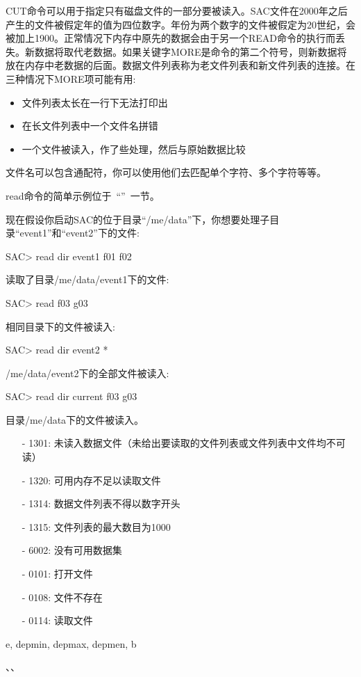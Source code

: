 CUT命令可以用于指定只有磁盘文件的一部分要被读入。SAC文件在2000年之后产生的文件被假定年的值为四位数字。年份为两个数字的文件被假定为20世纪，会被加上1900。正常情况下内存中原先的数据会由于另一个READ命令的执行而丢失。新数据将取代老数据。如果关键字MORE是命令的第二个符号，则新数据将放在内存中老数据的后面。数据文件列表称为老文件列表和新文件列表的连接。在三种情况下MORE项可能有用:
\begin{itemize}
\item 文件列表太长在一行下无法打印出
\item 在长文件列表中一个文件名拼错
\item 一个文件被读入，作了些处理，然后与原始数据比较
\end{itemize}
文件名可以包含通配符，你可以使用他们去匹配单个字符、多个字符等等。

read命令的简单示例位于~``''~一节。

现在假设你启动SAC的位于目录``/me/data''下，你想要处理子目录``event1''和``event2''下的文件:
\begin{SACCode}
SAC> read dir event1 f01 f02
\end{SACCode}
读取了目录/me/data/event1下的文件:
\begin{SACCode}
SAC> read f03 g03
\end{SACCode}
相同目录下的文件被读入:
\begin{SACCode}
SAC> read dir event2 *
\end{SACCode}
/me/data/event2下的全部文件被读入:
\begin{SACCode}
SAC> read dir current f03 g03
\end{SACCode}
目录/me/data下的文件被读入。

\begin{itemize}
\item[-]1301: 未读入数据文件（未给出要读取的文件列表或文件列表中文件均不可读）
\item[-]1320: 可用内存不足以读取文件
\item[-]1314: 数据文件列表不得以数字开头
\item[-]1315: 文件列表的最大数目为1000
\item[-]6002: 没有可用数据集
\end{itemize}

\begin{itemize}
\item[-]0101: 打开文件
\item[-]0108: 文件不存在
\item[-]0114: 读取文件
\end{itemize}

e, depmin, depmax, depmen, b 

、、
